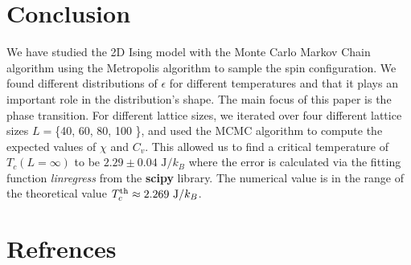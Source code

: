 \documentclass[english,notitlepage,reprint,nofootinbib]{revtex4-2}  %
\begin{document}
	
	\section{Conclusion}\label{sec:conclusion}
	We have studied the 2D Ising model with the Monte Carlo Markov Chain algorithm
	using the Metropolis algorithm to sample the spin configuration. We found different distributions of $\epsilon$ for different temperatures and that it plays
	an important role in the distribution's shape. The main focus of this paper is the
	phase transition. For different lattice sizes, we iterated over four different lattice
	sizes $L=$\{40, 60, 80, 100 \}, and used the MCMC algorithm to compute the expected values
	of $\chi$ and $C_v$. This allowed us to find a critical temperature of $T_c(L=\infty)$
	to be $ 2.29 \pm 0.04 \text{ J}/k_{B} $ where the error is calculated via the fitting function
	\textit{linregress} from the \textbf{scipy} library. The numerical value is in the range
	of the theoretical value $T_{c}^{\rm th} \approx 2.269 \text{ J}/k_{B}$.
	
	\onecolumngrid
	\section*{Refrences}
	
	
	
\end{document}
